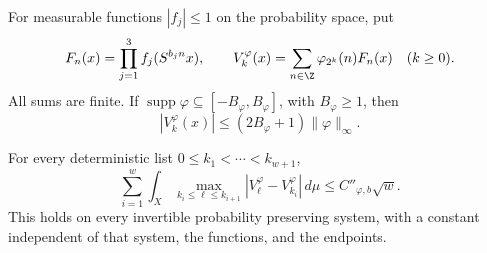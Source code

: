 For measurable functions \(|f_j|\leq1\) on the probability space,
put
\begin{equation}
 F_n(x)=\prod_{j=1}^3f_j(S^{b_jn}x),\qquad
 V_k^\varphi(x)=\sum_{n\in\Z}\varphi_{2^k}(n)F_n(x)
 \quad(k\geq0).
 \label{eq:tr-orbit-averages}
\end{equation}
All sums are finite.  If
\(\operatorname{supp}\varphi\subseteq[-B_\varphi,B_\varphi]\),
with \(B_\varphi\geq1\), then
\begin{equation}
 |V_k^\varphi(x)|\leq(2B_\varphi+1)\|\varphi\|_\infty.
 \label{eq:tr-uniform}
\end{equation}

\begin{proposition}
\label{prop:tr-oscillation}
For every deterministic list \(0\leq k_1<\cdots<k_{w+1}\),
\begin{equation}
 \sum_{i=1}^w\int_X
 \max_{k_i\leq\ell\leq k_{i+1}}
       |V_\ell^\varphi-V_{k_i}^\varphi|\,d\mu
 \leq C''_{\varphi,b}\sqrt w.
 \label{eq:tr-oscillation}
\end{equation}
This holds on every invertible probability preserving system, with a
constant independent of that system, the functions, and the endpoints.
\end{proposition}

